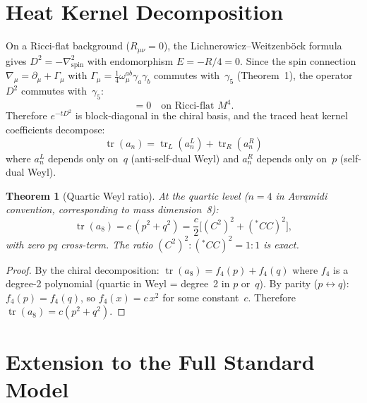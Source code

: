 \documentclass[12pt,a4paper]{article}
\newcommand{\tr}{\operatorname{tr}}
\newtheorem{theorem}{Theorem}[section]
\begin{document}
\section{Heat Kernel Decomposition}
\label{sec:heat}

On a Ricci-flat background ($R_{\mu\nu} = 0$), the Lichnerowicz--Weitzenb\"ock
formula gives $D^2 = -\nabla^2_{\mathrm{spin}}$ with endomorphism $E = -R/4 = 0$.
Since the spin connection $\nabla_\mu = \partial_\mu + \Gamma_\mu$ with
$\Gamma_\mu = \frac{1}{4}\omega_\mu^{ab}\gamma_a\gamma_b$ commutes
with~$\gamma_5$ (Theorem~1), the operator~$D^2$ commutes with~$\gamma_5$:
\begin{equation}
  [D^2,\, \gamma_5] = 0 \quad \text{on Ricci-flat } M^4.
\end{equation}
Therefore $e^{-tD^2}$ is block-diagonal in the chiral basis, and the traced
heat kernel coefficients decompose:
\begin{equation}
  \tr(a_n) = \tr_L(a_n^L) + \tr_R(a_n^R)
\end{equation}
where $a_n^L$ depends only on~$q$ (anti-self-dual Weyl) and $a_n^R$ depends
only on~$p$ (self-dual Weyl).

\begin{theorem}[Quartic Weyl ratio]
At the quartic level ($n = 4$ in Avramidi convention, corresponding to mass
dimension~8):
\begin{equation}\label{eq:ratio}
  \tr(a_8) = c\,(p^2 + q^2) = \frac{c}{2}\bigl[(C^2)^2 + ({}^*\!CC)^2\bigr],
\end{equation}
with zero $pq$ cross-term.  The ratio
$(C^2)^2 : ({}^*\!CC)^2 = 1{:}1$ is exact.
\end{theorem}

\begin{proof}
By the chiral decomposition: $\tr(a_8) = f_4(p) + f_4(q)$ where $f_4$ is a
degree-2 polynomial (quartic in Weyl = degree~2 in $p$ or~$q$).  By parity
($p \leftrightarrow q$): $f_4(p) = f_4(q)$, so $f_4(x) = c\,x^2$ for some
constant~$c$.  Therefore $\tr(a_8) = c(p^2 + q^2)$.
\end{proof}

\section{Extension to the Full Standard Model}
\label{sec:sm}
\end{document}
